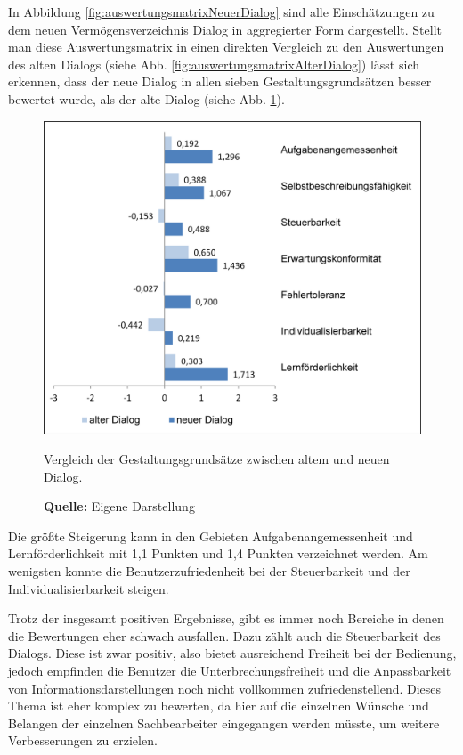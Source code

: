 In Abbildung \ref{fig:auswertungsmatrixNeuerDialog} sind alle Einschätzungen zu dem neuen Vermögensverzeichnis Dialog in aggregierter Form dargestellt. Stellt man diese Auswertungsmatrix in einen direkten Vergleich zu den Auswertungen des alten Dialogs (siehe Abb. \ref{fig:auswertungsmatrixAlterDialog}) lässt sich erkennen, dass der neue Dialog in allen sieben Gestaltungsgrundsätzen besser bewertet wurde, als der alte Dialog (siehe Abb. \ref{fig:vergleichBalkendiagramm}). 
\begin{figure}[H]
  \centering
  \includegraphics[]{img/ISO9241-10_Vergleich_Balkendiagramm.PNG}
  \caption{Vergleich der Gestaltungsgrundsätze zwischen altem und neuen Dialog.}
  \caption*{\textbf{Quelle:} Eigene Darstellung}
  \label{fig:vergleichBalkendiagramm}
\end{figure}
Die größte Steigerung kann in den Gebieten Aufgabenangemessenheit und Lernförderlichkeit mit 1,1 Punkten und 1,4 Punkten verzeichnet werden. Am wenigsten konnte die Benutzerzufriedenheit bei der Steuerbarkeit und der Individualisierbarkeit steigen. 

Trotz der insgesamt positiven Ergebnisse, gibt es immer noch Bereiche in denen die Bewertungen eher schwach ausfallen. Dazu zählt auch die Steuerbarkeit des Dialogs. Diese ist zwar positiv, also bietet ausreichend Freiheit bei der Bedienung, jedoch empfinden die Benutzer die Unterbrechungsfreiheit und die Anpassbarkeit von Informationsdarstellungen noch nicht vollkommen zufriedenstellend. Dieses Thema ist eher komplex zu bewerten, da hier auf die einzelnen Wünsche und Belangen der einzelnen Sachbearbeiter eingegangen werden müsste, um weitere Verbesserungen zu erzielen.

